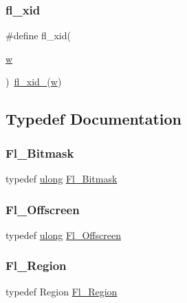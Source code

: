 \subsubsection{\texorpdfstring{fl\+\_\+xid}{fl\_xid}}
{\footnotesize\ttfamily \#define fl\+\_\+xid(\begin{DoxyParamCaption}\item[{}]{\hyperlink{forms_8_h_aac374e320caaadeca4874add33b62af2}{w} }\end{DoxyParamCaption})~\hyperlink{x_8_h_a4daabfb0d38b46de684f3d88af173299}{fl\+\_\+xid\+\_\+}(\hyperlink{forms_8_h_aac374e320caaadeca4874add33b62af2}{w})}



\subsection{Typedef Documentation}
\mbox{\label{x_8_h_a3a976d3779da5b4f61c5857e91aea10f}} 
\subsubsection{\texorpdfstring{Fl\+\_\+\+Bitmask}{Fl\_Bitmask}}
{\footnotesize\ttfamily typedef \hyperlink{fl__types_8h_a718b4eb2652c286f4d42dc18a8e71a1a}{ulong} \hyperlink{mac_8_h_a90133b6f8cfb11ab81d83b2c4d91310d}{Fl\+\_\+\+Bitmask}}

\mbox{\label{x_8_h_a709fcd66ef6c01574b6a85cad62a9dc4}} 
\subsubsection{\texorpdfstring{Fl\+\_\+\+Offscreen}{Fl\_Offscreen}}
{\footnotesize\ttfamily typedef \hyperlink{fl__types_8h_a718b4eb2652c286f4d42dc18a8e71a1a}{ulong} \hyperlink{mac_8_h_ad24d9679e17ea5ffa910ed355d4df340}{Fl\+\_\+\+Offscreen}}

\mbox{\label{x_8_h_a690c759f08955eddecf1e1014ef37fb8}} 
\subsubsection{\texorpdfstring{Fl\+\_\+\+Region}{Fl\_Region}}
{\footnotesize\ttfamily typedef Region \hyperlink{mac_8_h_ac80c9f95cc93c989c5a953a749f45cb6}{Fl\+\_\+\+Region}}




